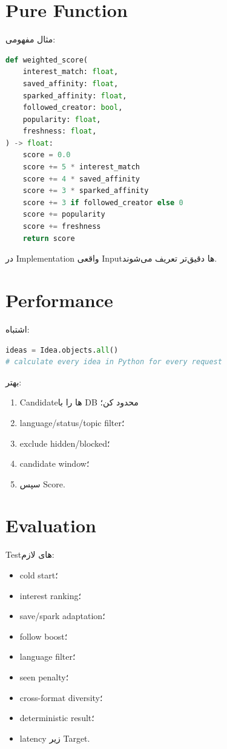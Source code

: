 \section{Pure Function}

مثال مفهومی:
\begin{latin}
\begin{lstlisting}[language=Python]
def weighted_score(
    interest_match: float,
    saved_affinity: float,
    sparked_affinity: float,
    followed_creator: bool,
    popularity: float,
    freshness: float,
) -> float:
    score = 0.0
    score += 5 * interest_match
    score += 4 * saved_affinity
    score += 3 * sparked_affinity
    score += 3 if followed_creator else 0
    score += popularity
    score += freshness
    return score
\end{lstlisting}
\end{latin}

در Implementation واقعی Inputها دقیق‌تر تعریف می‌شوند.

\section{Performance}

اشتباه:
\begin{latin}
\begin{lstlisting}[language=Python]
ideas = Idea.objects.all()
# calculate every idea in Python for every request
\end{lstlisting}
\end{latin}

بهتر:
\begin{enumerate}
  \item Candidateها را با DB محدود کن؛
  \item language/status/topic filter؛
  \item exclude hidden/blocked؛
  \item candidate window؛
  \item سپس Score.
\end{enumerate}

\section{Evaluation}

Testهای لازم:
\begin{itemize}
  \item cold start؛
  \item interest ranking؛
  \item save/spark adaptation؛
  \item follow boost؛
  \item language filter؛
  \item seen penalty؛
  \item cross-format diversity؛
  \item deterministic result؛
  \item latency زیر Target.
\end{itemize}

